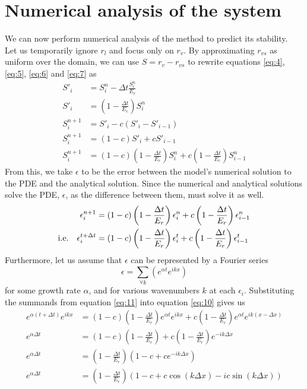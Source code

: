 \documentclass[11pt]{article}
\begin{document}
\section{Numerical analysis of the system}
We can now perform numerical analysis of the method to predict its stability. \\
Let us temporarily ignore $r_l$ and focus only on $r_v$. By approximating $r_{vs}$ as uniform over the domain, we can use $S=r_v-r_{vs}$ to rewrite equations \ref{eq:4}, \ref{eq:5}, \ref{eq:6} and \ref{eq:7} as
\begin{align}
S'_i &= S^n_i - \Delta t\frac{S^n_i}{E_r}		\nonumber \\
S'_i &= \left(1-\frac{\Delta t}{E_r}\right)S^n_i	\nonumber \\
S^{n+1}_i &= S'_i - c\left(S'_i - S'_{i-1}\right)		\nonumber \\
S^{n+1}_i &= \left(1-c\right)S'_i + cS'_{i-1}		\nonumber \\
S^{n+1}_i &= \left(1-c\right)\left(1-\frac{\Delta t}{E_r}\right)S^n_i + c\left(1-\frac{\Delta t}{E_r}\right)S^n_{i-1}	\label{eq:9}
\end{align}
From this, we take $\epsilon$ to be the error between the model's numerical solution to the PDE and the analytical solution. Since the numerical and analytical solutions solve the PDE, $\epsilon$, as the difference between them, must solve it as well.
\begin{align} \nonumber
\epsilon^{n+1}_i &= \left(1-c\right)\left(1-\frac{\Delta t}{E_r}\right)\epsilon^n_i + c\left(1-\frac{\Delta t}{E_r}\right)\epsilon^n_{i-1} \\
\label{eq:10} \text{i.e.\quad}
\epsilon^{t+\Delta t}_i &= \left(1-c\right)\left(1-\frac{\Delta t}{E_r}\right)\epsilon^t_i
+ c\left(1-\frac{\Delta t}{E_r}\right)\epsilon^t_{i-1}
\end{align}
Furthermore, let us assume that $\epsilon$ can be represented by a Fourier series
\begin{equation} \label{eq:11}
\epsilon = \sum_{\forall k}\left(e^{\alpha t}e^{ikx}\right)
\end{equation}
for some growth rate $\alpha$, and for various wavenumbers $k$ at each $\epsilon_i$. Substituting the summands from equation \ref{eq:11} into equation \ref{eq:10} gives us
\begin{align*}
e^{\alpha\left(t+\Delta t\right)}e^{ikx}
&= \left(1-c\right)\left(1-\frac{\Delta t}{E_r}\right)e^{\alpha t}e^{ikx}
+ c\left(1-\frac{\Delta t}{E_r}\right)e^{\alpha t}e^{ik\left(x-\Delta x\right)} \\
e^{\alpha\Delta t}
&= \left(1-c\right)\left(1-\frac{\Delta t}{E_r}\right)
+ c\left(1-\frac{\Delta t}{E_r}\right)e^{-ik\Delta x} \\
e^{\alpha\Delta t}
&= \left(1-\frac{\Delta t}{E_r}\right)\left(1-c+ce^{-ik\Delta x}\right) \\
e^{\alpha\Delta t}
&= \left(1-\frac{\Delta t}{E_r}\right)\left(1-c+c\cos\left(k\Delta x\right)-ic\sin\left(k\Delta x\right)\right)
\end{align*}
\end{document}
